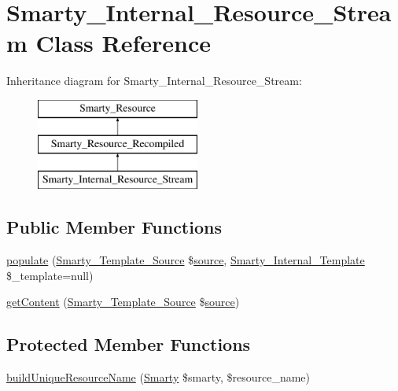 \hypertarget{class_smarty___internal___resource___stream}{}\section{Smarty\+\_\+\+Internal\+\_\+\+Resource\+\_\+\+Stream Class Reference}
\label{class_smarty___internal___resource___stream}
Inheritance diagram for Smarty\+\_\+\+Internal\+\_\+\+Resource\+\_\+\+Stream\+:\begin{figure}[H]
\begin{center}
\leavevmode
\includegraphics[height=3.000000cm]{class_smarty___internal___resource___stream}
\end{center}
\end{figure}
\subsection*{Public Member Functions}
\begin{DoxyCompactItemize}
\item 
\hyperlink{class_smarty___internal___resource___stream_a07a771f460d625d63fcb72d0aeed0b01}{populate} (\hyperlink{class_smarty___template___source}{Smarty\+\_\+\+Template\+\_\+\+Source} \$\hyperlink{class_smarty___resource_ab6ac6b66dac2da6c41a178102f7d53e4}{source}, \hyperlink{class_smarty___internal___template}{Smarty\+\_\+\+Internal\+\_\+\+Template} \$\+\_\+template=null)
\item 
\hyperlink{class_smarty___internal___resource___stream_a0e40116a3d4f59cf7ea39f83441169b8}{get\+Content} (\hyperlink{class_smarty___template___source}{Smarty\+\_\+\+Template\+\_\+\+Source} \$\hyperlink{class_smarty___resource_ab6ac6b66dac2da6c41a178102f7d53e4}{source})
\end{DoxyCompactItemize}
\subsection*{Protected Member Functions}
\begin{DoxyCompactItemize}
\item 
\hyperlink{class_smarty___internal___resource___stream_acadaf10ca33c215a82372c1144f0fe4a}{build\+Unique\+Resource\+Name} (\hyperlink{class_smarty}{Smarty} \$smarty, \$resource\+\_\+name)
\end{DoxyCompactItemize}

